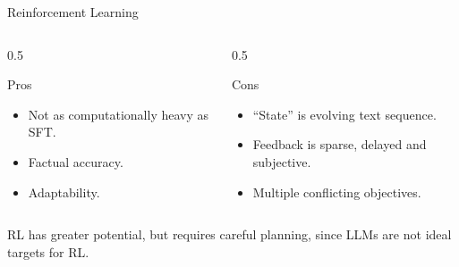 \documentclass[24pt]{beamer}
\begin{document}
\begin{frame}{Reinforcement Learning}
	\begin{columns}
		\begin{column}{0.5\textwidth}
			\begin{exampleblock}{Pros}
				\begin{itemize}
					\item Not as computationally heavy as SFT.
					\item Factual accuracy.
					\item Adaptability.
				\end{itemize}
			\end{exampleblock}
		\end{column}
		\begin{column}{0.5\textwidth}
			\begin{alertblock}{Cons}
				\begin{itemize}
					\item ``State'' is evolving text sequence.
					\item Feedback is sparse, delayed and subjective.
					\item Multiple conflicting objectives.
				\end{itemize}
			\end{alertblock}
		\end{column}
	\end{columns}
	
	\begin{block}{}
		RL has greater potential, but requires careful planning, since LLMs are \alert{not ideal targets} for RL.
	\end{block}
\end{frame}
\end{document}
